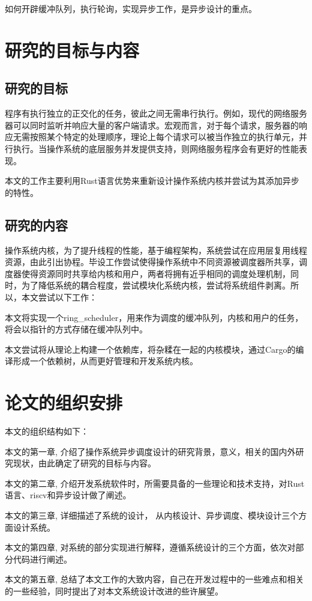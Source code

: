 如何开辟缓冲队列，执行轮询，实现异步工作，是异步设计的重点。

\section{研究的目标与内容}

\subsection{研究的目标}

程序有执行独立的正交化的任务，彼此之间无需串行执行。例如，现代的网络服务器可以同时监听并响应大量的客户端请求。宏观而言，对于每个请求，服务器的响应无需按照某个特定的处理顺序，理论上每个请求可以被当作独立的执行单元，并行执行。当操作系统的底层服务并发提供支持，则网络服务程序会有更好的性能表现。

本文的工作主要利用Rust语言优势来重新设计操作系统内核并尝试为其添加异步的特性。

\subsection{研究的内容}

操作系统内核，为了提升线程的性能，基于编程架构，系统尝试在应用层复用线程资源，由此引出协程。毕设工作尝试使得操作系统中不同资源被调度器所共享，调度器使得资源同时共享给内核和用户，两者将拥有近乎相同的调度处理机制，同时，为了降低系统的耦合程度，尝试模块化系统内核，尝试将系统组件剥离。所以，本文尝试以下工作：

本文将实现一个ring\_scheduler，用来作为调度的缓冲队列，内核和用户的任务，将会以指针的方式存储在缓冲队列中。

本文尝试将从理论上构建一个依赖库，将杂糅在一起的内核模块，通过Cargo的编译形成一个依赖树，从而更好管理和开发系统内核。

\section{论文的组织安排}

本文的组织结构如下：

本文的第一章, 介绍了操作系统异步调度设计的研究背景，意义，相关的国内外研究现状，由此确定了研究的目标与内容。

本文的第二章, 介绍开发系统软件时，所需要具备的一些理论和技术支持，对Rust语言、riscv和异步设计做了阐述。

本文的第三章, 详细描述了系统的设计， 从内核设计、异步调度、模块设计三个方面设计系统。

本文的第四章, 对系统的部分实现进行解释，遵循系统设计的三个方面，依次对部分代码进行阐述。

本文的第五章, 总结了本文工作的大致内容，自己在开发过程中的一些难点和相关的一些经验，同时提出了对本文系统设计改进的些许展望。
